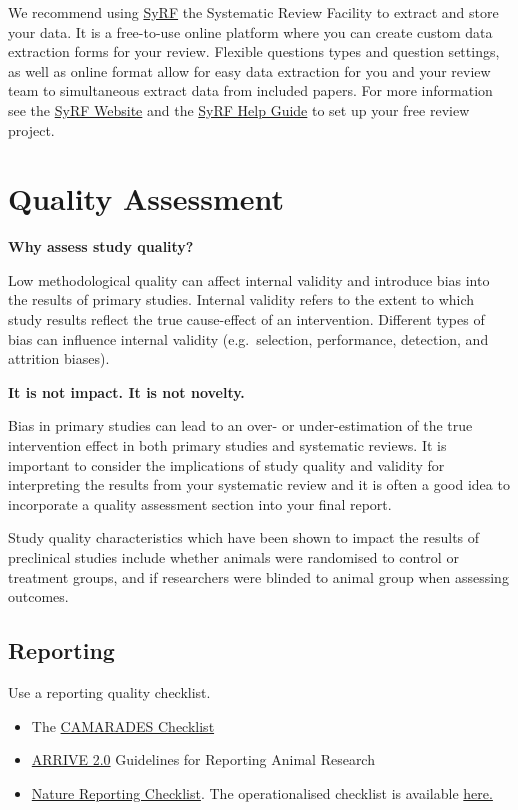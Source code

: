 \documentclass[
]{book}
\begin{document}
We recommend using \href{http://syrf.org.uk/}{SyRF} the Systematic Review Facility to extract and store your data. It is a free-to-use online platform where you can create custom data extraction forms for your review. Flexible questions types and question settings, as well as online format allow for easy data extraction for you and your review team to simultaneous extract data from included papers. For more information see the \href{http://syrf.org.uk/}{SyRF Website} and the \href{https://assets.syrf.org.uk/guides/SyRF_User_Guide.pdf}{SyRF Help Guide} to set up your free review project.

\hypertarget{quality-assessment}{%
\chapter{Quality Assessment}\label{quality-assessment}}

\textbf{Why assess study quality?}

Low methodological quality can affect internal validity and introduce bias into the results of primary studies. Internal validity refers to the extent to which study results reflect the true cause-effect of an intervention. Different types of bias can influence internal validity (e.g.~selection, performance, detection, and attrition biases).

\textbf{It is not impact. It is not novelty.}

Bias in primary studies can lead to an over- or under-estimation of the true intervention effect in both primary studies and systematic reviews. It is important to consider the implications of study quality and validity for interpreting the results from your systematic review and it is often a good idea to incorporate a quality assessment section into your final report.

Study quality characteristics which have been shown to impact the results of preclinical studies include whether animals were randomised to control or treatment groups, and if researchers were blinded to animal group when assessing outcomes.

\hypertarget{reporting}{%
\section{Reporting}\label{reporting}}

Use a reporting quality checklist.

\begin{itemize}
\item
  The \href{https://www.ahajournals.org/doi/pdf/10.1161/01.str.0000125719.25853.20}{CAMARADES Checklist}
\item
  \href{https://journals.plos.org/plosbiology/article?id=10.1371/journal.pbio.3000410}{ARRIVE 2.0} Guidelines for Reporting Animal Research
\item
  \href{https://media.nature.com/full/nature-assets/ncomms/authors/ncomms_lifesciences_checklist.pdf}{Nature Reporting Checklist}. The operationalised checklist is available \href{https://link.springer.com/article/10.1007/s11192-016-1964-8/tables/6}{here.}
\end{itemize}
\end{document}
